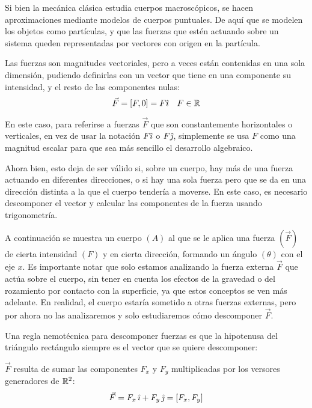 \documentclass[a5paper,12pt,twoside]{book}
\begin{document}
Si bien la mecánica clásica estudia cuerpos macroscópicos, se hacen aproximaciones mediante modelos de cuerpos puntuales.
De aquí que se modelen los objetos como partículas, y que las fuerzas que estén actuando sobre un sistema queden representadas por vectores con origen en la partícula.

Las fuerzas son magnitudes vectoriales, pero a veces están contenidas en una sola dimensión, pudiendo definirlas con un vector que tiene en una componente su intensidad, y el resto de las componentes nulas:
\[
  \Vec{F} = \left[ F,0 \right] = F \hat{\imath} \quad F \in \mathbb{R}
\]

En este caso, para referirse a fuerzas $\Vec{F}$ que son constantemente horizontales o verticales, en vez de usar la notación $F \hat{\imath}$ o $F \hat{\jmath}$, simplemente se usa $F$ como una magnitud escalar para que sea más sencillo el desarrollo algebraico.

Ahora bien, esto deja de ser válido si, sobre un cuerpo, hay más de una fuerza actuando en diferentes direcciones, o si hay una sola fuerza pero que se da en una dirección distinta a la que el cuerpo tendería a moverse.
En este caso, es necesario descomponer el vector y calcular las componentes de la fuerza usando trigonometría.

A continuación se muestra un cuerpo $(A)$ al que se le aplica una fuerza $(\Vec{F})$ de cierta intensidad $(F)$ y en cierta dirección, formando un ángulo $(\theta)$ con el eje $x$.
Es importante notar que solo estamos analizando la fuerza externa $\Vec{F}$ que actúa sobre el cuerpo, sin tener en cuenta los efectos de la gravedad o del rozamiento por contacto con la superficie, ya que estos conceptos se ven más adelante.
En realidad, el cuerpo estaría sometido a otras fuerzas externas, pero por ahora no las analizaremos y solo estudiaremos cómo descomponer $\Vec{F}$.

\begin{center}
    \def\svgwidth{0.7\linewidth}
    
\end{center}

Una regla nemotécnica para descomponer fuerzas es que la hipotenusa del triángulo rectángulo siempre es el vector que se quiere descomponer:

\begin{center}
    \def\svgwidth{0.5\linewidth}
    
\end{center}

$\Vec{F}$ resulta de sumar las componentes $F_x$ y $F_y$ multiplicadas por los versores generadores de $\mathbb{R}^2$:
\[ \Vec{F} = F_x \, \hat{\imath} + F_y \, \hat{\jmath} = [F_x,F_y] \]
\end{document}
